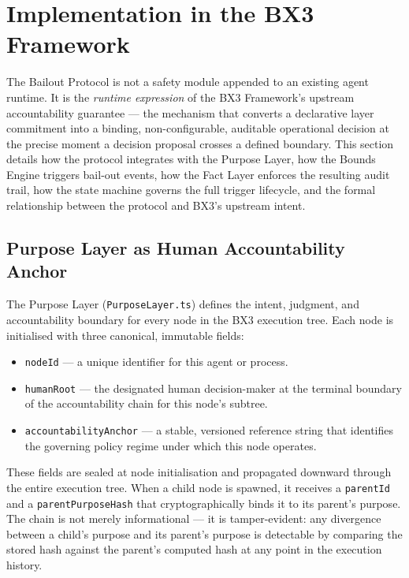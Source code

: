 
\section{Implementation in the BX3 Framework}
\label{sec:bailout-implementation}

The Bailout Protocol is not a safety module appended to an existing agent runtime.
It is the \emph{runtime expression} of the BX3 Framework's upstream accountability
guarantee --- the mechanism that converts a declarative layer commitment into a binding,
non-configurable, auditable operational decision at the precise moment a decision
proposal crosses a defined boundary.  This section details how the protocol integrates
with the Purpose Layer, how the Bounds Engine triggers bail-out events, how the Fact Layer
enforces the resulting audit trail, how the state machine governs the full trigger
lifecycle, and the formal relationship between the protocol and BX3's upstream intent.

\subsection{Purpose Layer as Human Accountability Anchor}

The Purpose Layer (\texttt{PurposeLayer.ts}) defines the intent, judgment, and
accountability boundary for every node in the BX3 execution tree.  Each node is
initialised with three canonical, immutable fields:

\begin{itemize}
  \item \texttt{nodeId} --- a unique identifier for this agent or process.
  \item \texttt{humanRoot} --- the designated human decision-maker at the terminal
        boundary of the accountability chain for this node's subtree.
  \item \texttt{accountabilityAnchor} --- a stable, versioned reference string that
        identifies the governing policy regime under which this node operates.
\end{itemize}

These fields are sealed at node initialisation and propagated downward through the
entire execution tree.  When a child node is spawned, it receives a \texttt{parentId}
and a \texttt{parentPurposeHash} that cryptographically binds it to its parent's
purpose.  The chain is not merely informational --- it is tamper-evident: any divergence
between a child's purpose and its parent's purpose is detectable by comparing the
stored hash against the parent's computed hash at any point in the execution history.

